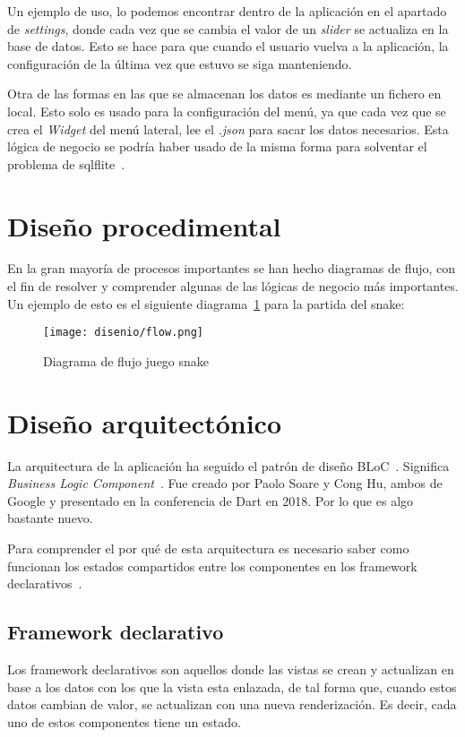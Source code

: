 \begin{itemize}
	Un ejemplo de uso, lo podemos encontrar dentro de la aplicación en el apartado de \emph{settings}, donde cada vez que se cambia el valor de un \emph{slider} se actualiza en la base de datos. Esto se hace para que cuando el usuario vuelva a la aplicación, la configuración de la última vez que estuvo se siga manteniendo.
	
\end{itemize}

Otra de las formas en las que se almacenan los datos es mediante un fichero en local. Esto solo es usado para la configuración del menú, ya que cada vez que se crea el \emph{Widget} del menú lateral, lee el \emph{.json} para sacar los datos necesarios. Esta lógica de negocio se podría haber usado de la misma forma para solventar el problema de sqlflite~\pageref{sqlflite}.

\section{Diseño procedimental}
En la gran mayoría de procesos importantes se han hecho diagramas de flujo, con el fin de resolver y comprender algunas de las lógicas de negocio más importantes. Un ejemplo de esto es el siguiente diagrama~\ref{fig:snakediagrama} para la partida del snake:

	\begin{figure}[H]
		\centering
		\texttt{[image: disenio/flow.png]}
		\caption{Diagrama de flujo juego snake}\label{fig:snakediagrama}
	\end{figure}

\section{Diseño arquitectónico}
La arquitectura de la aplicación ha seguido el patrón de diseño BLoC~\cite{xurxodev:bloc}. Significa \emph{Business Logic Component}~\pageref{bloc}. Fue creado por Paolo Soare y Cong Hu, ambos de Google y presentado en la conferencia de Dart en 2018. Por lo que es algo bastante nuevo.

Para comprender el por qué de esta arquitectura es necesario saber como funcionan los estados compartidos entre los componentes en los framework declarativos~\pageref{declarativo}.

\subsection{Framework declarativo}\label{declarativo}
Los framework declarativos son aquellos donde las vistas se crean y actualizan en base a los datos con los que la vista esta enlazada, de tal forma que, cuando estos datos cambian de valor, se actualizan con una nueva renderización. Es decir, cada uno de estos componentes tiene un estado.

